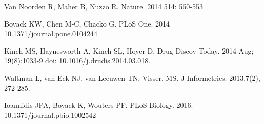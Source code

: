 \documentclass[10pt,letterpaper]{article}
\begin{document}
\begin{thebibliography}{10}
Van Noorden R, Maher B, Nuzzo R.
\newblock Nature. 2014 514: 550-553 

Boyack KW, Chen M-C, Chacko G. 
\newblock  PLoS One. 2014 10.1371/journal.pone.0104244

Kinch MS, Haynesworth A, Kinch SL, Hoyer D.
\newblock  Drug Discov Today. 2014 Aug; 19(8):1033-9 doi: 10.1016/j.drudis.2014.03.018.

Waltman L, van Eck NJ, van Leeuwen TN, Visser, MS.
\newblock  J Informetrics. 2013.7(2), 272-285.

Ioannidis JPA, Boyack K, Wouters PF.
\newblock  PLoS Biology. 2016. 10.1371/journal.pbio.1002542

\end{thebibliography}
\end{document}
